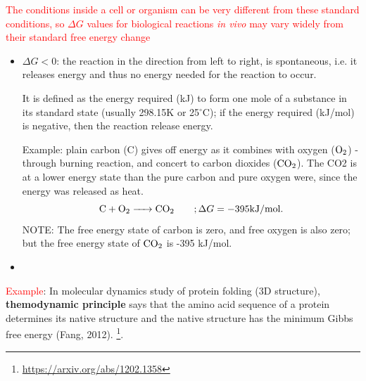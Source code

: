 \textcolor{red}{The conditions inside a cell or organism can be very different
from these standard conditions, so $\Delta G$ values for biological reactions 
{\it in vivo} may vary widely from their standard free energy change}

\begin{itemize}
  \item $\Delta G < 0$:  the reaction in the direction from left to right, is
  spontaneous, i.e. it releases energy and thus no energy needed for the
  reaction to occur.

It is defined as the energy required (kJ) to form one mole of a substance in its
standard state (usually 298.15K or 25$^\circ$C); if the energy required
(kJ/mol) is negative, then the reaction release energy.

Example: plain carbon (C) gives off energy as it combines with oxygen
($\ce{O2}$) - through burning reaction, and concert to carbon dioxides
($\ce{CO2}$).  The CO2 is at a lower energy state than the pure carbon and pure
oxygen were, since the energy was released as heat.
\begin{equation}
\ce{ C + O2 -> CO2 } \qquad; \Delta G = -395 \text{kJ/mol.}
\end{equation}
NOTE: The free energy state of carbon is zero, and free oxygen is also zero; but
the free energy state of $\ce{CO2}$ is -395 kJ/mol.
  
  \item 
\end{itemize}

\textcolor{red}{Example}: In molecular dynamics study of protein
folding (3D structure), {\bf themodynamic principle} says that 
the amino acid sequence of a protein determines its native structure and the
native structure has the minimum Gibbs free energy (Fang, 2012).
\footnote{\url{https://arxiv.org/abs/1202.1358}}.

